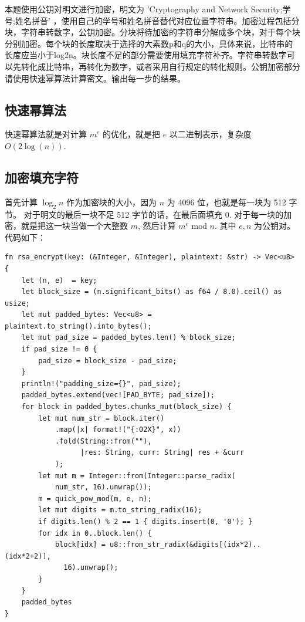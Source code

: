 \documentclass[degree=project,degree-type=project,cjk-font=noto]{thuthesis}
\begin{document}
本题使用公钥对明文进行加密，明文为 'Cryptography and Network Security;学号;姓名拼音' ，使用自己的学号和姓名拼音替代对应位置字符串。加密过程包括分块，字符串转数字，公钥加密。分块将待加密的字符串分解成多个块，对于每个块分别加密。每个块的长度取决于选择的大素数p和q的大小，具体来说，比特串的长度应当小于log2n。块长度不足的部分需要使用填充字符补齐。字符串转数字可以先转化成比特串，再转化为数字，或者采用自行规定的转化规则。公钥加密部分请使用快速幂算法计算密文。输出每一步的结果。

\subsection{快速幂算法}
快速幂算法就是对计算 $m^e$ 的优化，就是把 $e$ 以二进制表示，复杂度 $O(2\log(n))$.

\subsection{加密填充字符}

首先计算 $\log_2 n$ 作为加密块的大小，因为 $n$ 为 4096 位，也就是每一块为 512 字节。
对于明文的最后一块不足 512 字节的话，在最后面填充 0.
对于每一块的加密，就是把这一块当做一个大整数 $m$, 然后计算 $m^e \text{ mod } n$.
其中 $e, n$ 为公钥对。
代码如下：

  \begin{verbatim}
fn rsa_encrypt(key: (&Integer, &Integer), plaintext: &str) -> Vec<u8> {
    let (n, e)  = key;
    let block_size = (n.significant_bits() as f64 / 8.0).ceil() as usize;
    let mut padded_bytes: Vec<u8> = plaintext.to_string().into_bytes();
    let mut pad_size = padded_bytes.len() % block_size;
    if pad_size != 0 {
        pad_size = block_size - pad_size;
    }
    println!("padding_size={}", pad_size);
    padded_bytes.extend(vec![PAD_BYTE; pad_size]);
    for block in padded_bytes.chunks_mut(block_size) {
        let mut num_str = block.iter()
            .map(|x| format!("{:02X}", x))
            .fold(String::from(""),
                  |res: String, curr: String| res + &curr
            );
        let mut m = Integer::from(Integer::parse_radix(
            num_str, 16).unwrap());
        m = quick_pow_mod(m, e, n);
        let mut digits = m.to_string_radix(16);
        if digits.len() % 2 == 1 { digits.insert(0, '0'); }
        for idx in 0..block.len() {
            block[idx] = u8::from_str_radix(&digits[(idx*2)..(idx*2+2)],
              16).unwrap();
        }
    }
    padded_bytes
}
\end{verbatim}
\end{document}

